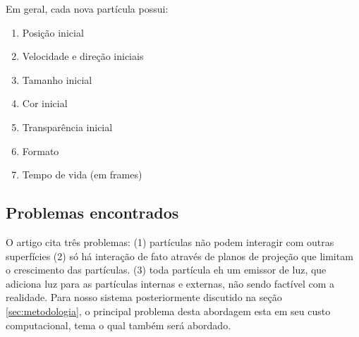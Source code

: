 Em geral, cada nova partícula possui: 

\begin{enumerate}
  \setlength{\itemsep}{0.05em}
\item Posição inicial
\item Velocidade e direção iniciais
\item Tamanho inicial
\item Cor inicial
\item Transparência inicial
\item Formato
\item Tempo de vida (em frames)
\end{enumerate}

\subsection{Problemas encontrados}
O artigo cita três problemas: (1) partículas não podem interagir com outras superfícies (2) só há interação de fato através de planos de projeção que limitam o crescimento das partículas. (3) toda partícula eh um emissor de luz, que adiciona luz para as partículas internas e externas, não sendo factível com a realidade. Para nosso sistema posteriormente discutido na seção \ref{sec:metodologia}, o principal problema desta abordagem esta em seu custo computacional, tema o qual também será abordado.
